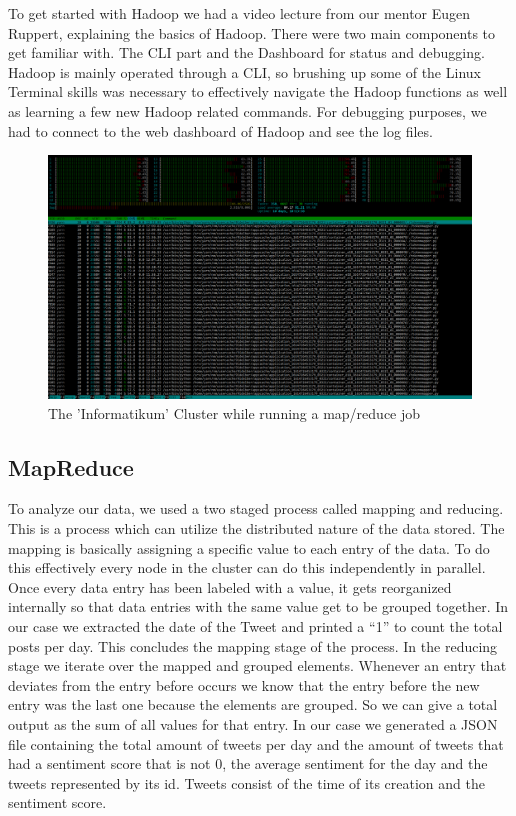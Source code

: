 \documentclass[
    fontsize=12pt,
    headings=small,
    parskip=half,           %
    bibliography=totoc,
    numbers=noenddot,       %
    open=any,               %
    ]{scrreprt}
\begin{document}
To get started with Hadoop we had a video lecture from our mentor Eugen Ruppert, explaining the basics of Hadoop. There were two main components to get familiar with. The CLI part and the Dashboard for status and debugging. Hadoop is mainly operated through a CLI, so brushing up some of the Linux Terminal skills was necessary to effectively navigate the Hadoop functions as well as learning a few new Hadoop related commands. For debugging purposes, we had to connect to the web dashboard of Hadoop and see the log files. 
\begin{center}
\begin{figure}
    \includegraphics[scale=.35]{cluster.png}
    \caption{The 'Informatikum' Cluster while running a map/reduce job}
\end{figure}
\end{center}


\subsection{MapReduce}
To analyze our data, we used a two staged process called mapping and reducing. This is a process which can utilize the distributed nature of the data stored. The mapping is basically assigning a specific value to each entry of the data. To do this effectively every node in the cluster can do this independently in parallel. Once every data entry has been labeled with a value, it gets reorganized internally so that data entries with the same value get to be grouped together. In our case we extracted the date of the Tweet and printed a “1” to count the total posts per day. This concludes the mapping stage of the process. In the reducing stage we iterate over the mapped and grouped elements. Whenever an entry that deviates from the entry before occurs we know that the entry before the new entry was the last one because the elements are grouped. So we can give a total output as the sum of all values for that entry. In our case we generated a JSON file containing the total amount of tweets per day and the amount of tweets that had a sentiment score that is not 0, the average sentiment for the day and the tweets represented by its id. Tweets consist of the time of its creation and the sentiment score.
\end{document}
